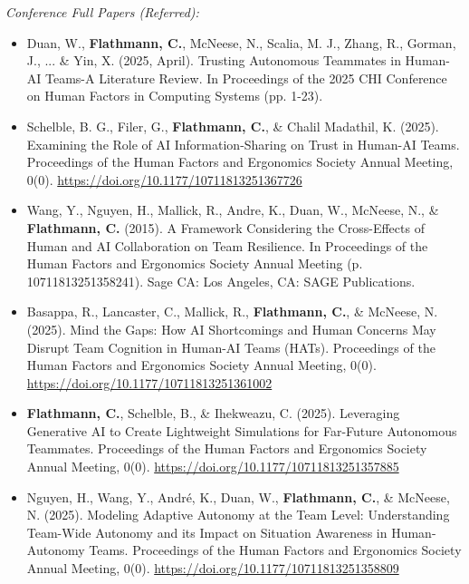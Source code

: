 \bigskip \noindent
\textit{Conference Full Papers (Referred):} 
\bigskip \noindent

\begin{itemize}[align=left, labelwidth=3em,]
\setlength\itemsep{1em}

\item[C.20] Duan, W., \textbf{Flathmann, C.}, McNeese, N., Scalia, M. J., Zhang, R., Gorman, J., ... \& Yin, X. (2025, April). Trusting Autonomous Teammates in Human-AI Teams-A Literature Review. In Proceedings of the 2025 CHI Conference on Human Factors in Computing Systems (pp. 1-23). \\

\item[C.19] Schelble, B. G., Filer, G., \textbf{Flathmann, C.}, \& Chalil Madathil, K. (2025). Examining the Role of AI Information-Sharing on Trust in Human-AI Teams. Proceedings of the Human Factors and Ergonomics Society Annual Meeting, 0(0). \url{https://doi.org/10.1177/10711813251367726} \\

\item[C.18] Wang, Y., Nguyen, H., Mallick, R., Andre, K., Duan, W., McNeese, N., \& \textbf{Flathmann, C.} (2015). A Framework Considering the Cross-Effects of Human and AI Collaboration on Team Resilience. In Proceedings of the Human Factors and Ergonomics Society Annual Meeting (p. 10711813251358241). Sage CA: Los Angeles, CA: SAGE Publications. \\

\item[C.17] Basappa, R., Lancaster, C., Mallick, R., \textbf{Flathmann, C.}, \& McNeese, N. (2025). Mind the Gaps: How AI Shortcomings and Human Concerns May Disrupt Team Cognition in Human-AI Teams (HATs). Proceedings of the Human Factors and Ergonomics Society Annual Meeting, 0(0). \url{https://doi.org/10.1177/10711813251361002} \\


\item[C.16] \textbf{Flathmann, C.}, Schelble, B., \& Ihekweazu, C. (2025). Leveraging Generative AI to Create Lightweight Simulations for Far-Future Autonomous Teammates. Proceedings of the Human Factors and Ergonomics Society Annual Meeting, 0(0). \url{https://doi.org/10.1177/10711813251357885} \\


\item[C.15] Nguyen, H., Wang, Y., André, K., Duan, W., \textbf{Flathmann, C.}, \& McNeese, N. (2025). Modeling Adaptive Autonomy at the Team Level: Understanding Team-Wide Autonomy and its Impact on Situation Awareness in Human-Autonomy Teams. Proceedings of the Human Factors and Ergonomics Society Annual Meeting, 0(0). \url{https://doi.org/10.1177/10711813251358809} \\



\end{itemize}
